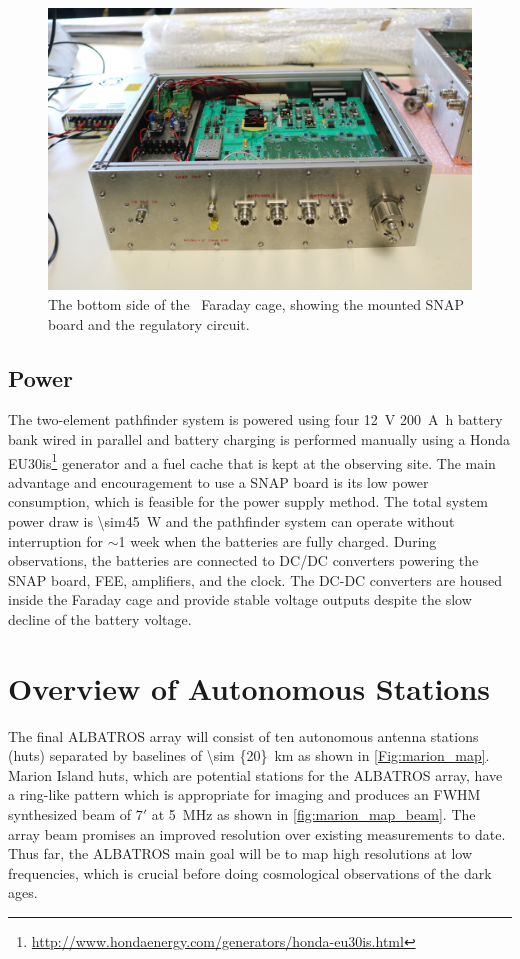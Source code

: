 \begin{figure}
	\centering
	\includegraphics[width=0.8\linewidth]{Figures/47093128324_04792aa5c5_o}
	\caption{The bottom side of the \albatros\ Faraday cage, showing the mounted SNAP board and the regulatory circuit. }
	\label{fig:47093128324_04792aa5c5_o}
\end{figure}

\subsection{Power}
The two-element pathfinder system is powered using four \SI{12}{\volt} \SI{200}{\ampere\hour} battery bank wired in parallel and battery charging is performed manually using a Honda EU30is\footnote {\url{http://www.hondaenergy.com/generators/honda-eu30is.html}} generator and a fuel cache that is kept at the observing site. The main advantage and encouragement to use a SNAP board is its low power consumption, which is feasible for the power supply method. The total system power draw is \SI{\sim45}{\watt} and the pathfinder system can operate without interruption for $\sim$1 week when the batteries are fully charged. During observations, the batteries are connected to DC/DC converters powering the SNAP board, FEE, amplifiers, and the clock. The DC-DC converters are housed inside the Faraday cage and provide stable voltage outputs	despite the slow decline of the battery voltage.

\section{Overview of Autonomous Stations}

The final ALBATROS array will consist of ten autonomous antenna stations (huts) separated by baselines of \SI{\sim {20}}{km} as shown in \autoref{Fig:marion_map}. Marion Island huts, which are potential stations for the ALBATROS array, have a ring-like pattern which is appropriate for imaging and produces an FWHM synthesized beam of $7'$ at \SI{5}{\mega\hertz} as shown in \ref{fig:marion_map_beam}. The array beam promises an improved resolution over existing measurements to date. Thus far, the ALBATROS main goal will be to map high resolutions at low frequencies, which is crucial before doing cosmological observations of the dark ages. 

